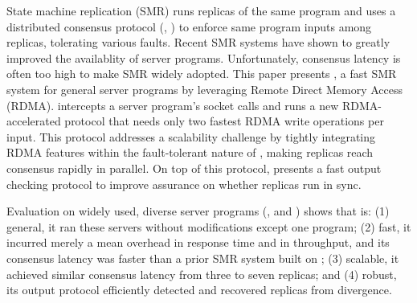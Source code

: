 

State machine replication (SMR) runs replicas of the same program and 
uses a distributed consensus protocol (\eg, \paxos) to enforce same program 
inputs among replicas, tolerating various faults. Recent SMR systems have shown 
to greatly improved the availablity of server programs. Unfortunately, consensus 
latency is often too high to make SMR widely adopted. This paper presents \xxx, 
a fast SMR system for general server programs by leveraging Remote Direct 
Memory Access (RDMA). \xxx intercepts a server program's socket calls and runs 
a new RDMA-accelerated \paxos protocol that needs only two fastest RDMA write 
operations per input. This protocol addresses a scalability challenge by 
tightly integrating RDMA features within the fault-tolerant nature of \paxos, 
making replicas reach consensus rapidly in parallel. On top of this protocol, 
\xxx presents a fast output checking protocol to improve assurance on whether 
replicas run in sync.


Evaluation on \nprog widely used, diverse server programs (\eg, \memcached and 
\mysql) shows that \xxx is: (1) general, it ran these servers 
without modifications except one program; (2) fast, it incurred merely a 
\latencyoverhead mean overhead in response time and \tputoverhead in 
throughput, and its consensus latency was \fasterthanzookeeper faster than 
a prior SMR system built on \zookeeper; (3) scalable, it achieved similar 
consensus latency from three to seven replicas; and (4) robust, its output 
protocol efficiently detected and recovered replicas from divergence.

